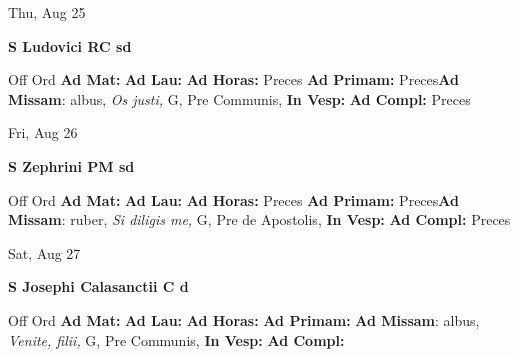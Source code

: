 \documentclass[10pt]{book}
\begin{document}
\begin{center}
\begin{minipage}{3.5in}
\vspace{2em}
\begin{center}Thu, Aug 25
\end{center}
\textbf{ \large S Ludovici RC
\textnormal{\normalsize sd}}

\begin{justify}Off Ord
\textbf{Ad Mat: }
\textbf{Ad Lau: }
\textbf{Ad Horas: }Preces
\textbf{Ad Primam: }Preces\textbf{Ad Missam}: albus, \textit{Os justi,} G, Pre Communis, 
\textbf{In Vesp: }
\textbf{Ad Compl: }Preces
\end{justify}
\end{minipage}
\end{center}

\begin{center}
\begin{minipage}{3.5in}
\vspace{2em}
\begin{center}Fri, Aug 26
\end{center}
\textbf{ \large S Zephrini PM
\textnormal{\normalsize sd}}

\begin{justify}Off Ord
\textbf{Ad Mat: }
\textbf{Ad Lau: }
\textbf{Ad Horas: }Preces
\textbf{Ad Primam: }Preces\textbf{Ad Missam}: ruber, \textit{Si diligis me,} G, Pre de Apostolis, 
\textbf{In Vesp: }
\textbf{Ad Compl: }Preces
\end{justify}
\end{minipage}
\end{center}

\begin{center}
\begin{minipage}{3.5in}
\vspace{2em}
\begin{center}Sat, Aug 27
\end{center}
\textbf{ \large S Josephi Calasanctii C
\textnormal{\normalsize d}}

\begin{justify}Off Ord
\textbf{Ad Mat: }
\textbf{Ad Lau: }
\textbf{Ad Horas: }
\textbf{Ad Primam: }\textbf{Ad Missam}: albus, \textit{Venite, filii,} G, Pre Communis, 
\textbf{In Vesp: }
\textbf{Ad Compl: }
\end{justify}
\end{minipage}
\end{center}
\end{document}
